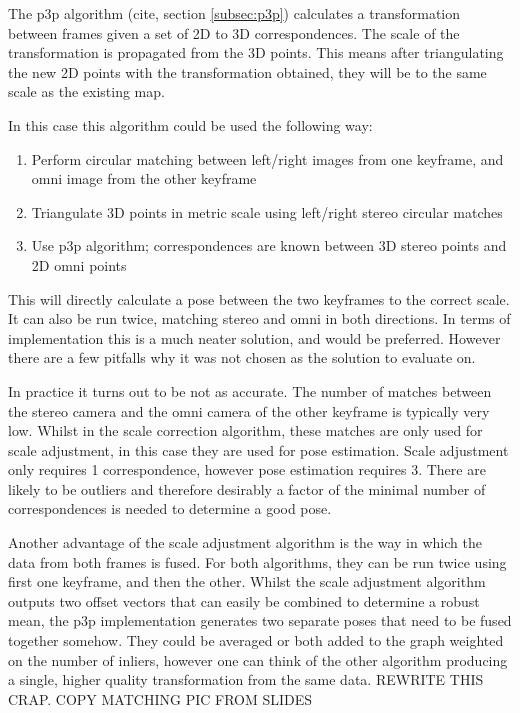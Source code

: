 The p3p algorithm (cite, section \ref{subsec:p3p}) calculates a transformation between frames given a set of 2D to 3D correspondences.  The scale of the transformation is propagated from the 3D points.  This means after triangulating the new 2D points with the transformation obtained, they will be to the same scale as the existing map.

In this case this algorithm could be used the following way:

\begin{enumerate}
\itemsep0em
 \item Perform circular matching between left/right images from one keyframe, and omni image from the other keyframe
 \item Triangulate 3D points in metric scale using left/right stereo circular matches
 \item Use p3p algorithm; correspondences are known between 3D stereo points and 2D omni points
\end{enumerate}

This will directly calculate a pose between the two keyframes to the correct scale.  It can also be run twice, matching stereo and omni in both directions. In terms of implementation this is a much neater solution, and would be preferred.  However there are a few pitfalls why it was not chosen as the solution to evaluate on.

In practice it turns out to be not as accurate.  The number of matches between the stereo camera and the omni camera of the other keyframe is typically very low.  Whilst in the scale correction algorithm, these matches are only used for scale adjustment, in this case they are used for pose estimation.  Scale adjustment only requires 1 correspondence, however pose estimation requires 3.  There are likely to be outliers and therefore desirably a factor of the minimal number of correspondences is needed to determine a good pose.

Another advantage of the scale adjustment algorithm is the way in which the data from both frames is fused.  For both algorithms, they can be run twice using first one keyframe, and then the other.  Whilst the scale adjustment algorithm outputs two offset vectors that can easily be combined to determine a robust mean, the p3p implementation generates two separate poses that need to be fused together somehow.  They could be averaged or both added to the graph weighted on the number of inliers, however one can think of the other algorithm producing a single, higher quality transformation from the same data.
REWRITE THIS CRAP. COPY MATCHING PIC FROM SLIDES
 
